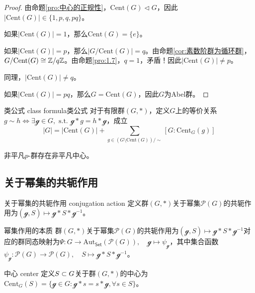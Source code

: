 \begin{proof}
	由命题\ref{pro:中心的正规性}，$\mathrm{Cent}(G)\lhd G$，因此$|\mathrm{Cent}(G)|\in\{ 1,p,q,pq \}$。
	
	如果$|\mathrm{Cent}(G)|=1$，那么$\mathrm{Cent}(G)=\{e\}$。
	
	如果$|\mathrm{Cent}(G)|=p$，那么$|G/\mathrm{Cent}(G)|=q$。由命题\ref{cor:素数阶群为循环群}，$G/\mathrm{Cent}(G)\cong\mathbb{Z}/q\mathbb{Z}$。由命题\ref{pro:1.7}，$q=1$，矛盾！因此$|\mathrm{Cent}(G)|\ne p$。
	
	同理，$|\mathrm{Cent}(G)|\ne q$。
	
	如果$|\mathrm{Cent}(G)|=pq$，那么$G=\mathrm{Cent}(G)$，因此$G$为Abel群。
\end{proof}

\begin{theorem}{类公式 class formula}{类公式}
	对于有限群$(G,*)$，定义$G$上的等价关系$g\sim h\iff \exists \mathcal{g}\in G,\text{ s.t. }\mathcal{g}*g=h*\mathcal{g}$，成立
	$$
	|G|=|\mathrm{Cent}(G)|+\sum_{g\in (G\setminus\mathrm{Cent}(G))/\sim}[G:\mathrm{Cent}_G(g)]
	$$
\end{theorem}

\begin{corollary}
	非平凡$p$-群存在非平凡中心。
\end{corollary}

\subsection{关于幂集的共轭作用}

\begin{definition}{关于幂集的共轭作用 conjugation action}
	定义群$(G,*)$关于幂集$\mathscr{P}(G)$的共轭作用为$(\mathcal{g},S)\mapsto \mathcal{g}*S*\mathcal{g}^{-1}$。
\end{definition}

\begin{theorem}{幂集作用的本质}
	群$(G,*)$关于幂集$\mathscr{P}(G)$的共轭作用为$(\mathcal{g},S)\mapsto \mathcal{g}*S*\mathcal{g}^{-1}$对应的群同态映射为$\Psi:G\to \mathrm{Aut}_{\mathsf{Set}}(\mathscr{P}(G)),\quad \mathcal{g}\mapsto \psi_{\mathcal{g}}$，其中集合函数$\psi_{\mathcal{g}}:\mathscr{P}(G)\to \mathscr{P}(G),\quad S\mapsto \mathcal{g}* S *\mathcal{g}^{-1}$。
\end{theorem}

\begin{definition}{中心 center}
	定义$S\subset G$关于群$(G,*)$的中心为$\mathrm{Cent}_G(S)=\{ \mathcal{g}\in G:\mathcal{g}*s=s*\mathcal{g},\forall s\in S \}$。
\end{definition}

